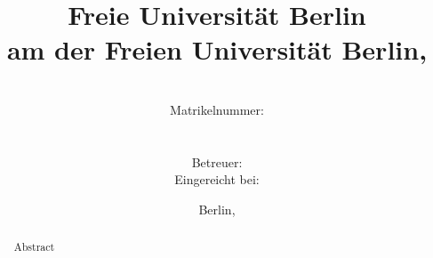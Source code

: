 \documentclass[11pt,a4paper,ngerman]{article}
\title{{\huge\bfseries Freie Universität Berlin}\\[2ex]
{\normalsize \thesisType{} am \instituteName{} der Freien Universität Berlin,
\groupName}\\[6ex]
\thesisTitle}
\author{\studentName\\
{\normalsize Matrikelnummer: }\\
{\normalsize \mailto{\studentEmail}}\\\\
{\normalsize Betreuer: }\\
{\normalsize Eingereicht bei: }}
\date{Berlin, \thesisDate}
\begin{document}
\begin{titlepage}

\maketitle
\thispagestyle{empty}

\vfill{}

\begin{abstract}
Abstract
\end{abstract}

\vfill{}

\end{titlepage}

\pagestyle{empty}
\clearpage{}



\tableofcontents

\clearpage{}
\pagestyle{fancy}
\setcounter{page}{1}





\appendix




\end{document}
